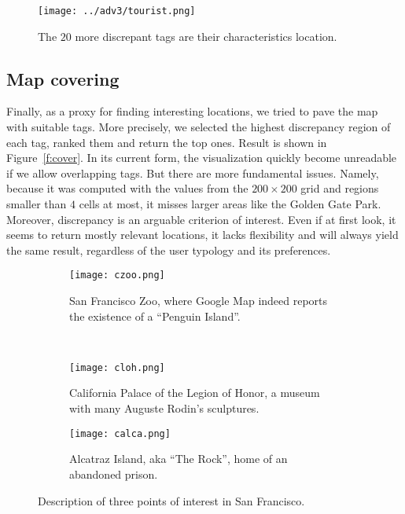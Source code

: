 \begin{figure}[b]
\centering
\vspace{-1\baselineskip}
\texttt{[image: ../adv3/tourist.png]}
\caption{The $20$ more discrepant tags are their characteristics
location.\label{f:cover}}
\vspace{-1\baselineskip}
\end{figure}

\subsection{Map covering}

Finally, as a proxy for finding interesting locations, we tried to pave the
map with suitable tags. More precisely, we selected the highest discrepancy
region of each tag, ranked them and return the top ones. Result is shown in
Figure~\vref{f:cover}. In its current form, the visualization quickly become
unreadable if we allow overlapping tags. But there are more fundamental
issues. Namely, because it was computed with the values from the $200\times
200$ grid and regions smaller than $4$ cells at most, it misses larger areas
like the Golden Gate Park.  Moreover, discrepancy is an arguable criterion of
interest. Even if at first look, it seems to return mostly relevant locations,
it lacks flexibility and will always yield the same result, regardless of the
user typology and its preferences.

\begin{figure}[p]
        \centering
        \begin{subfigure}[b]{0.49\textwidth}
                \texttt{[image: czoo.png]}
                \caption{San Francisco Zoo, where Google Map indeed reports
the existence of a \enquote{Penguin Island}.}
        \end{subfigure}~
        \begin{subfigure}[b]{0.49\textwidth}
                \texttt{[image: cloh.png]}
                \caption{California Palace of the Legion of Honor, a museum
					with many Auguste Rodin's sculptures.}
        \end{subfigure}

        \begin{subfigure}[b]{0.5\textwidth}
                \texttt{[image: calca.png]}
                \caption{Alcatraz Island, aka \enquote{The Rock}, home of an
abandoned prison.\label{f:alca}}
        \end{subfigure}
		\caption{Description of three points of interest in San Francisco.\label{f:loc}}
\end{figure}
\restoregeometry
